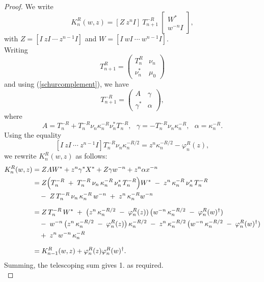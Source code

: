 \documentclass[11pt]{article}
\begin{document}
\begin{proof}
We write $$
K_{n}^{R}(w,z)=[Z ~ z^{n}I]~T_{n+1}^{-R}~\begin{bmatrix}
W^{*}\\
w^{-n}I
\end{bmatrix},
$$ with $Z=[I ~ zI ~\cdots ~ z^{n-1}I]$ and $W=[I ~ wI ~\cdots ~ w^{n-1}I]$.\\
Writing  
$$
T^{R}_{n+1}=
\begin{pmatrix}
T^{R}_{n} & \nu_{n}\\
\nu^{*}_{n} & \mu_{0}
\end{pmatrix}
$$ 
and using (\ref{schurcomplement}), we have 
$$
T^{-R}_{n+1}=
\begin{pmatrix}
A & \gamma\\
\gamma^{*} & \alpha
\end{pmatrix},
$$
where 
$$
A = T^{-R}_{n} + T^{-R}_{n}\nu_{n}\kappa_{n}^{-R}\nu_{n}^{*}T^{-R}_{n},~~~ \gamma = -T^{-R}_{n}\nu_{n}\kappa_{n}^{-R},~~~ \alpha = \kappa_{n}^{-R}.
$$
Using the equality 
$$
[I ~ zI ~\cdots ~ z^{n-1}I]T^{-R}_{n}\nu_{n}\kappa_{n}^{-R/2}
= z^{n}\kappa_{n}^{-R/2} - \varphi_{n}^{R}(z),
$$
we rewrite $K_{n}^{R}(w,z)$ as follows:
\begin{align*}
K_{n}^{R}(w,z)
&= ZAW^{*} + z^{n}\gamma^{*}X^{*}+Z\gamma w^{-n} + z^{n}\alpha x^{-n}\\
&= Z \Bigl(T_{n}^{-R} \;+\; T_{n}^{-R}\,\nu_{n}\,\kappa_{n}^{-R}\,\nu_{n}^{*}\,T_{n}^{-R}\Bigr) W^{*}
   \;-\; z^{n}\,\kappa_{n}^{-R}\,\nu_{n}^{*}\,T_{n}^{-R}\\
   \;& \quad -\; Z\,T_{n}^{-R}\,\nu_{n}\,\kappa_{n}^{-R}\,w^{-n}   
   \;+\; z^{n}\,\kappa_{n}^{-R} w^{-n}\, \\[6pt]
&= Z\,T_{n}^{-R}\,W^{*}
   \;+\;\bigl(z^{n}\,\kappa_{n}^{-R/2}\;-\;\varphi_{n}^{R}(z))\,
    \bigl(w^{-n}\,\kappa_{n}^{-R/2}\;-\;\varphi_{n}^R(w)^{\dag}) \\
&\quad -\;w^{-n}\,\bigl(z^{n}\,\kappa_{n}^{-R/2}\;-\;\varphi_{n}^{R}(z)\bigr)\,\kappa_{n}^{-R/2}
   \;-\;z^{n}\,\kappa_{n}^{-R/2}\,\bigl(w^{-n}\,\kappa_{n}^{-R/2}\;-\;\varphi_{n}^{R}(w)^{\dag}) \\
&\quad +\;z^{n}\,w^{-n}\,\kappa_{n}^{-R} \\[6pt]
&= K_{n-1}^{R}(w,z) + \varphi_{n}^{R}(z) \varphi_{n}^{R}(w)^{\dag}.
\end{align*}
Summing, the telescoping sum gives 1. as required.\\


\end{proof}
\end{document}
